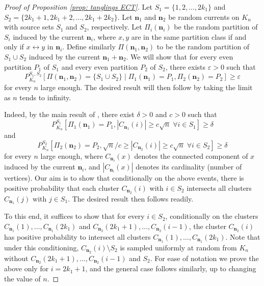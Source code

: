 \documentclass[11pt,a4paper]{article}
\theoremstyle{definition}
\numberwithin{equation}{section}
\newcommand\n{\mathbf{n}}
\begin{document}
\begin{proof}[Proof of Proposition \textup{\ref{prop: tanglings ECT}}]
Let $S_1=\{1,2,\ldots,2k_1\}$ and $S_2=\{2k_1+1,2k_1+2,\ldots,2k_1+2k_2\}$. Let $\n_1$ and $\n_2$ be random currents on $K_n$ with source sets $S_1$ and $S_2$, respectively. Let $\Pi_i(\n_i)$ be the random partition of $S_i$ induced by the current $\n_i$, where $x,y$ are in the same partition class if and only if $x\longleftrightarrow y$ in $\n_i$. Define similarly $\Pi(\n_1,\n_2)$ to be the random partition of $S_1\cup S_2$ induced by the current $\n_1+\n_2$. We will show that for every even partition $P_1$ of $S_1$ and every even partition $P_2$ of $S_2$, there exists $\varepsilon>0$ such that
\begin{equation}
P^{S_1,S_2}_{K_n}[\Pi(\n_1,\n_2)=\{S_1\cup S_2\} \mid \Pi_1(\n_1)=P_1, \Pi_2(\n_2)=P_2]\geq \varepsilon    
\end{equation}
for every $n$ large enough. The desired result will then follow by taking the limit as $n$ tends to infinity.

Indeed, by the main result of \cite{KPP24}, there exist $\delta>0$ and $c>0$ such that 
\begin{equation}
P^{S_1}_{K_n}[\Pi_1(\n_1)=P_1, |C_{\n_1}(i)|\geq c\sqrt{n} \; \forall i\in S_1]\geq \delta     
\end{equation}
and 
\begin{equation}
P^{S_2}_{K_n}[\Pi_2(\n_2)=P_2, \sqrt{n}/c\geq |C_{\n_2}(i)|\geq c\sqrt{n} \; \forall i\in S_2]\geq \delta     
\end{equation}
for every $n$ large enough, where $C_{\n_i}(x)$ denotes the connected component of $x$ induced by the current $\n_i$, and $|C_{\n_i}(x)|$ denotes its cardinality (number of vertices). Our aim is to show that conditionally on the above events, there is positive probability that each cluster $C_{\n_2}(i)$ with $i\in S_2$ intersects all clusters $C_{\n_1}(j)$ with $j\in S_1$. The desired result then follows readily.

To this end, it suffices to show that for every $i\in S_2$, conditionally on the clusters $C_{\n_1}(1),\ldots,C_{\n_1}(2k_1)$ and $C_{\n_2}(2k_1+1),\ldots,C_{\n_2}(i-1)$, the cluster $C_{\n_2}(i)$ has positive probability to intersect all clusters $C_{\n_1}(1),\ldots,C_{\n_1}(2k_1)$. Note that under this conditioning, $C_{\n_2}(i)\setminus S_2$ is sampled uniformly at random from $K_n$ without $C_{\n_2}(2k_1+1), \ldots, C_{\n_2}(i-1)$ and $S_2$. For ease of notation we prove the above only for $i=2k_1+1$, and the general case follows similarly, up to changing the value of $n$. 


\end{proof}
\end{document}
